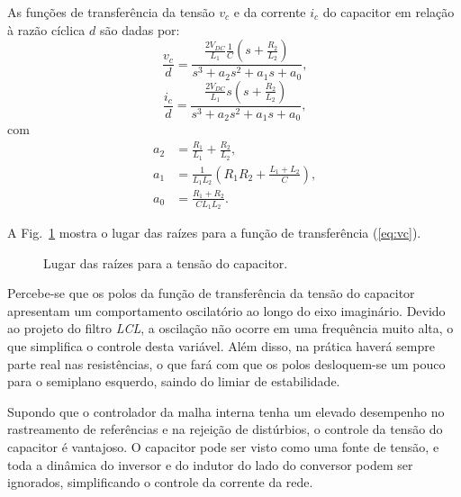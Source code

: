   As funções de transferência da tensão $v_c$ e da corrente $i_c$ do capacitor em relação à razão cíclica $d$ são dadas por:
  \begin{equation}
    \frac{v_c}{d} = \frac{\frac{2V_{DC}}{L_1} \frac{1}{C}
    	\left( s + \frac{R_2}{L_2} \right)}{s^3 + a_2 s^2 + a_1 s + a_0} \text{,}
    \label{eq:vc}
  \end{equation}
  \begin{equation}
    \frac{i_c}{d} = \frac{\frac{2V_{DC}}{L_1} s
    	\left( s + \frac{R_2}{L_2} \right)}{s^3 + a_2 s^2 + a_1 s + a_0} \text{,}
    \label{eq:ic}
  \end{equation}
  com
  \begin{equation}
  	\begin{split}
      a_2 & = \frac{R_1}{L_1} + \frac{R_2}{L_2} \text{,} \\
      a_1 & = \frac{1}{L_1 L_2} \left( R_1 R_2
      	+ \frac{L_1 + L_2}{C} \right) \text{,} \\
      a_0 & = \frac{R_1 + R_2}{C L_1 L_2} \text{.}
    \end{split}
  \end{equation}

  A Fig.~\ref{fig:rlocus_vc} mostra o lugar das raízes para a função de transferência (\ref{eq:vc}).

  \begin{figure}[htb]
    \centering{
      }
    \renewcommand\figurename{Fig.}
    \caption{Lugar das raízes para a tensão do capacitor.}
    \label{fig:rlocus_vc}
  \end{figure}

  Percebe-se que os polos da função de transferência da tensão do capacitor apresentam um comportamento oscilatório ao longo do eixo imaginário. Devido ao projeto do filtro \emph{LCL}, a oscilação não ocorre em uma frequência muito alta, o que simplifica o controle desta variável. Além disso, na prática haverá sempre parte real nas resistências, o que fará com que os polos desloquem-se um pouco para o semiplano esquerdo, saindo do limiar de estabilidade.

  Supondo que o controlador da malha interna tenha um elevado desempenho no rastreamento de referências e na rejeição de distúrbios, o controle da tensão do capacitor é vantajoso. O capacitor pode ser visto como uma fonte de tensão, e toda a dinâmica do inversor e do indutor do lado do conversor podem ser ignorados, simplificando o controle da corrente da rede.

